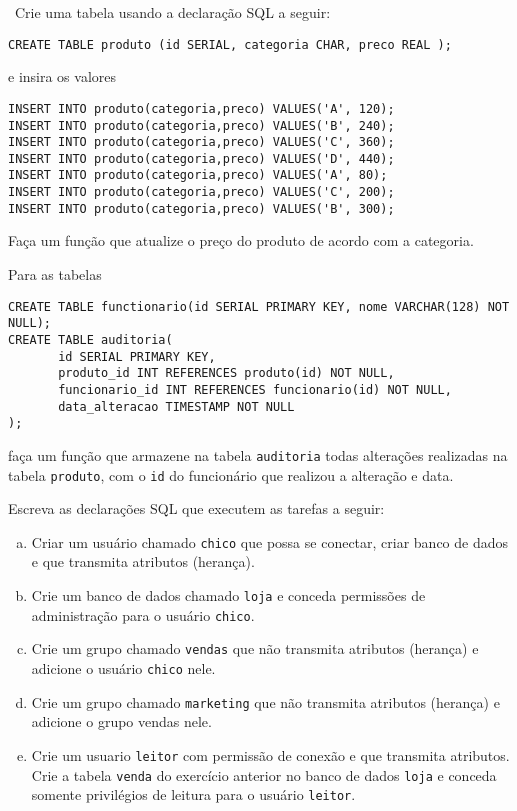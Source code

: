 
~Crie uma tabela usando a declaração SQL a seguir:

\begin{verbatim}
CREATE TABLE produto (id SERIAL, categoria CHAR, preco REAL );
\end{verbatim}

\noindent e insira os valores

\begin{verbatim}
INSERT INTO produto(categoria,preco) VALUES('A', 120);
INSERT INTO produto(categoria,preco) VALUES('B', 240);
INSERT INTO produto(categoria,preco) VALUES('C', 360);
INSERT INTO produto(categoria,preco) VALUES('D', 440);
INSERT INTO produto(categoria,preco) VALUES('A', 80);
INSERT INTO produto(categoria,preco) VALUES('C', 200);
INSERT INTO produto(categoria,preco) VALUES('B', 300);
\end{verbatim}

\noindent Faça um função que atualize o preço do produto de acordo
com a categoria.

\bigskip
\noindent Para as tabelas

\begin{verbatim}
CREATE TABLE functionario(id SERIAL PRIMARY KEY, nome VARCHAR(128) NOT NULL);
CREATE TABLE auditoria(
       id SERIAL PRIMARY KEY, 
       produto_id INT REFERENCES produto(id) NOT NULL, 
       funcionario_id INT REFERENCES funcionario(id) NOT NULL,
       data_alteracao TIMESTAMP NOT NULL
);
\end{verbatim}

\noindent faça um função que armazene na tabela {\tt auditoria}
todas alterações realizadas na tabela {\tt produto}, com o {\tt id}
do funcionário que realizou a alteração e data.




 Escreva as declarações SQL que executem as tarefas a seguir:

\begin{enumerate}[a)]
\item Criar um usuário chamado {\tt chico} que possa se conectar, 
criar banco de dados e que transmita atributos (herança).
\item Crie um banco de dados chamado {\tt loja} e conceda permissões 
de administração para o usuário {\tt chico}.
\item Crie um grupo chamado {\tt vendas} que não transmita atributos (herança) 
e adicione o usuário {\tt chico} nele.
\item Crie um grupo chamado {\tt marketing} que não transmita atributos (herança) e adicione o grupo vendas nele.
\item Crie um usuario {\tt leitor} com permissão de conexão e que transmita atributos. Crie a tabela {\tt venda} do exercício anterior no banco de dados {\tt loja} e conceda somente privilégios de leitura para o usuário {\tt leitor}.
\end{enumerate} 

